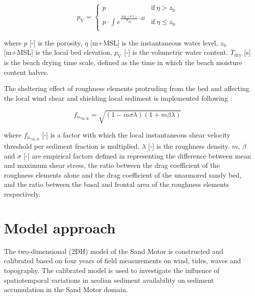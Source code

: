 \begin{equation}
  \label{eq:drying}
  p_{\mathrm{V}} = \left\{
    \begin{array}{ll}
      p & \mathrm{if} ~ \eta > z_{\mathrm{b}} \\
      p \cdot \int e^{\frac{\log \left( 0.5 \right)}{T_{\mathrm{dry}}} \cdot \mathrm{d} t} & \mathrm{if} ~ \eta \leq z_{\mathrm{b}} \\
    \end{array}
  \right.
\end{equation}

\noindent where $p$ [-] is the porosity, $\eta$ [m+MSL] is the
instantaneous water level, $z_{\mathrm{b}}$ [m+MSL] is the local bed
elevation, $p_{\mathrm{V}}$ [-] is the volumetric water
content. $T_{\mathrm{dry}}$ [s] is the beach drying time scale,
defined as the time in which the beach moisture content halves.

The sheltering effect of roughness elements protruding from the bed
and affecting the local wind shear and shielding local sediment is
implemented following \citet{Raupach1993}:

\begin{equation}
  \label{eq:raupach}
  f_{u_{\mathrm{* th, R}}} = \sqrt{ \left( 1 - m \sigma \lambda \right) \left( 1 + m \beta \lambda \right) }
\end{equation}

\noindent where $f_{u_{\mathrm{* th},R}}$ [-] is a factor with which
the local instantaneous shear velocity threshold per sediment fraction
is multiplied. $\lambda$ [-] is the roughness density. $m$, $\beta$
and $\sigma$ [-] are empirical factors defined in \citet{Raupach1993}
representing the difference between mean and maximum shear stress, the
ratio between the drag coefficient of the roughness elements alone and
the drag coefficient of the unarmored sandy bed, and the ratio between
the basal and frontal area of the roughness elements respectively.

\section{Model approach}


The two-dimensional (2DH) model of the Sand Motor is constructed and
calibrated based on four years of field measurements on wind, tides,
waves and topography. The calibrated model is used to investigate the
influence of spatiotemporal variations in aeolian sediment
availability on sediment accumulation in the Sand Motor domain.

